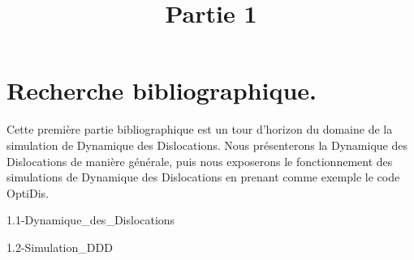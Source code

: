 \documentclass[11pt,class=article,float=false,crop=false]{standalone}
\title{ Partie 1 }
\begin{document}
	
\onlyifstandalone{\maketitle}
\onlyifstandalone{\tableofcontents}
\onlyifstandalone{\listoftodos}

\part{Recherche bibliographique.}

Cette première partie bibliographique est un tour d'horizon du domaine de la simulation de Dynamique des Dislocations. Nous présenterons la Dynamique des Dislocations de manière générale, puis nous exposerons le fonctionnement des simulations de Dynamique des Dislocations en prenant comme exemple le code OptiDis.

{1.1-Dynamique_des_Dislocations}

{1.2-Simulation_DDD}

\end{document}
